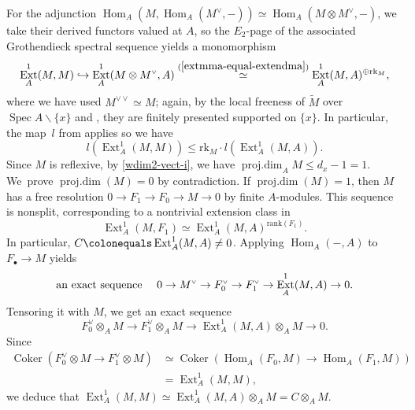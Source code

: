 \documentclass[JEP,XML,SOM,Unicode,published]{cedram}
\newcommand\hto{\mathrel{\lhook\joinrel\to}}
\let\oldvee\vee
\renewcommand{\vee}{{\scriptscriptstyle\oldvee}}
\newcommand{\sbullet}{{\scriptscriptstyle\bullet}}
\let\backslash\smallsetminus
\let\hra\hto
\let\ce\colonequals
\let\q\quad
\newcommand{\ddual}{\vee\vee}
\DeclareMathOperator{\Coker}{Coker}
\DeclareMathOperator{\Spec}{Spec}
\DeclareMathOperator{\pd}{proj.dim}
\DeclareMathOperator{\Hom}{Hom}
\DeclareMathOperator{\Ext}{Ext}
\theoremstyle{plain}
\theoremstyle{definition}
\begin{document}
For the adjunction $\Hom_A(M,\Hom_A(M^{\vee},-))\simeq \Hom_A(M\otimes M^{\vee},-)$, we take their derived functors valued at $A$, so the $E_2$-page of the associated Grothendieck spectral sequence yields a monomorphism
\[
\Ext_A^1(M,M) \hra \Ext^1_A(M\otimes M^{\vee},A)\overset{(\ref{extmma-equal-extendma})}{\simeq} \Ext^1_A(M,A)^{\oplus \mathrm{rk}_M},
\]
where we have used $M^{\ddual}\simeq M$; again, by the local freeness of $\widetilde{M}$ over $\Spec A\backslash \{x\}$ and , they are finitely presented supported on $\{x\}$. In particular, the map~$l$ from  applies so we have
\begin{equation}\label{length-extmm-extmma}
l(\Ext_A^1(M,M)) \le \mathrm{rk}_M\cdot l(\Ext_A^1(M,A)).
\end{equation}
Since $M$ is reflexive, by \eqref{wdim2-vect-i}, we have $\pd_A M\le d_x-1=1$.
We~prove $\pd(M)=0$ by contradiction.
If $\pd(M)= 1$, then $M$ has a free resolution $0\to F_1\to F_0\to M\to 0$ by finite $A$\nobreakdash-mod\-ules.
This sequence is nonsplit, corresponding to a nontrivial extension class in
\[
\Ext^1_A(M,F_1)\simeq \Ext^1_A(M,A)^{\mathrm{rank}(F_1)}.
\]
In particular, $C\ce \Ext_A^1(M,A) \neq 0$. Applying $\Hom_A(-,A)$ to $F_{\sbullet}\to M$ yields
\[
\text{an exact sequence \q $0\to M^{\vee} \to F_0^{\vee} \to F_1^{\vee} \to \Ext_A^1(M,A) \to 0$.}
\]
Tensoring it with $M$, we get an exact sequence
\[
F_0^{\vee}\otimes_A M \to F_1^{\vee}\otimes_A M \to \Ext_A^1(M,A) \otimes_A M \to 0.
\]
Since
\begin{equation*}
\begin{split}
\Coker\left(F_0^{\vee}\otimes M \to F_1^{\vee}\otimes M\right) & \simeq \Coker\left(\Hom_A(F_0,M)\to \Hom_A(F_1,M)\right) \\
& = \Ext_A^1(M,M),
\end{split}
\end{equation*}
we deduce that $\Ext_A^1(M,M) \simeq \Ext_A^1(M,A) \otimes_A M=C\otimes_A M$.
\end{document}

